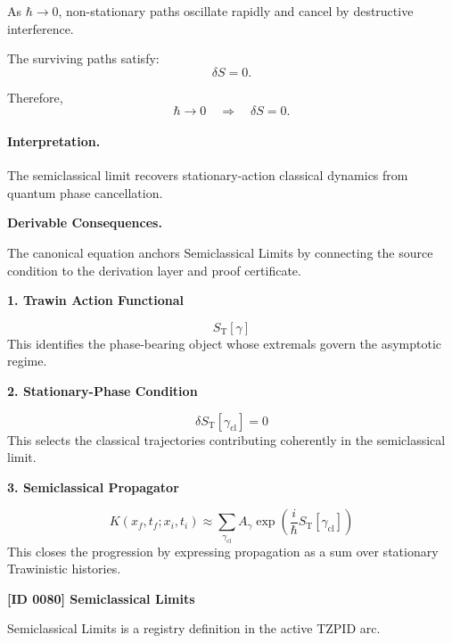 As $\hbar\to 0$, non-stationary paths oscillate rapidly and cancel by destructive interference.

The surviving paths satisfy:
\begin{equation}
\delta S=0 .
\end{equation}

Therefore,
\begin{equation}
\boxed{
\hbar\rightarrow 0
\quad\Longrightarrow\quad
\delta S=0 .
}
\end{equation}

\paragraph{Interpretation.}
The semiclassical limit recovers stationary-action classical dynamics from quantum phase cancellation.

\par\vspace{0.35em}
\noindent\textbf{Derivable Consequences.}\quad
\begingroup
\footnotesize
\raggedright
The canonical equation anchors Semiclassical Limits by connecting the source condition to the derivation layer and proof certificate.
\par\endgroup

\noindent\textbf{1. Trawin Action Functional}\par
\[
S_{\mathrm{T}}[\gamma]
\]
\noindent This identifies the phase-bearing object whose extremals govern the asymptotic regime.\par
\noindent\textbf{2. Stationary-Phase Condition}\par
\[
\delta S_{\mathrm{T}}[\gamma_{\mathrm{cl}}] = 0
\]
\noindent This selects the classical trajectories contributing coherently in the semiclassical limit.\par
\noindent\textbf{3. Semiclassical Propagator}\par
\[
K(x_f,t_f;x_i,t_i)
\approx
\sum_{\gamma_{\mathrm{cl}}}
A_{\gamma}
\exp\!\left(\frac{i}{\hbar}S_{\mathrm{T}}[\gamma_{\mathrm{cl}}]\right)
\]
\noindent This closes the progression by expressing propagation as a sum over stationary Trawinistic histories.\par

\clearpage
\noindent\textbf{[ID 0080] Semiclassical Limits}\par
\vspace{0.35em}
\begingroup\small
{}
Semiclassical Limits is a registry definition in the active TZPID arc.

